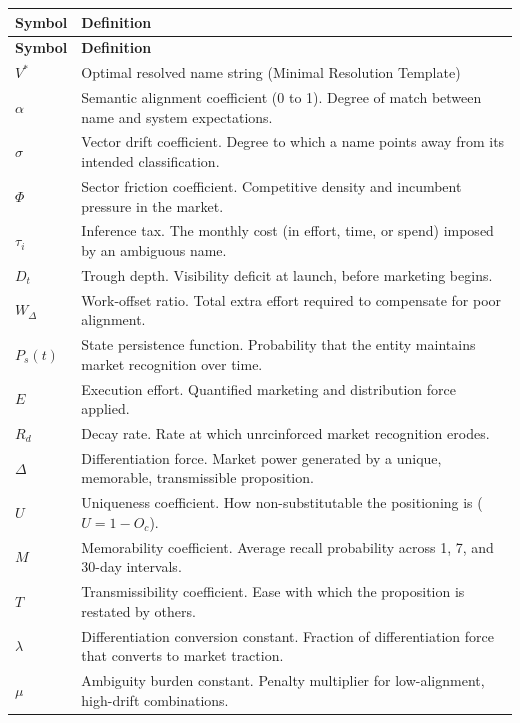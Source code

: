 \documentclass[12pt, openany]{book}
\theoremstyle{thmstyle}
\theoremstyle{defstyle}
\newcommand{\vstar}{V^{*}}
\begin{document}
\begin{longtable}[l]{@{}p{1.4in} p{4.6in}@{}}
\toprule
\textbf{Symbol} & \textbf{Definition} \\
\midrule
\endfirsthead
\toprule
\textbf{Symbol} & \textbf{Definition} \\
\midrule
\endhead
\bottomrule
\endfoot
$\vstar$ & Optimal resolved name string (Minimal Resolution Template) \\[4pt]
$\alpha$ & Semantic alignment coefficient (0 to 1). Degree of match between name and system expectations. \\[4pt]
$\sigma$ & Vector drift coefficient. Degree to which a name points away from its intended classification. \\[4pt]
$\Phi$ & Sector friction coefficient. Competitive density and incumbent pressure in the market. \\[4pt]
$\tau_i$ & Inference tax. The monthly cost (in effort, time, or spend) imposed by an ambiguous name. \\[4pt]
$D_t$ & Trough depth. Visibility deficit at launch, before marketing begins. \\[4pt]
$W_\Delta$ & Work-offset ratio. Total extra effort required to compensate for poor alignment. \\[4pt]
$P_s(t)$ & State persistence function. Probability that the entity maintains market recognition over time. \\[4pt]
$E$ & Execution effort. Quantified marketing and distribution force applied. \\[4pt]
$R_d$ & Decay rate. Rate at which unrcinforced market recognition erodes. \\[4pt]
$\Delta$ & Differentiation force. Market power generated by a unique, memorable, transmissible proposition. \\[4pt]
$U$ & Uniqueness coefficient. How non-substitutable the positioning is ($U = 1 - O_c$). \\[4pt]
$M$ & Memorability coefficient. Average recall probability across 1, 7, and 30-day intervals. \\[4pt]
$T$ & Transmissibility coefficient. Ease with which the proposition is restated by others. \\[4pt]
$\lambda$ & Differentiation conversion constant. Fraction of differentiation force that converts to market traction. \\[4pt]
$\mu$ & Ambiguity burden constant. Penalty multiplier for low-alignment, high-drift combinations. \\[4pt]

\end{longtable}
\end{document}
